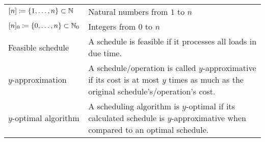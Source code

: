 \begin{table}[H]
\begin{tabularx}{\textwidth}{ | >{\centering\arraybackslash}X | >{\arraybackslash}m{} | }
  \hline \multicolumn{2}{|c|}{\textbf{\large Miscellaneous}} \\  
  \hline $[n]\coloneqq\{1,\dotsc,n\}\subset\mathbb{N}$&Natural numbers from $1$ to $n$\\
  \hline $[n]_0\coloneqq\{0,\dotsc,n\}\subset\mathbb{N}_0$&Integers from $0$ to $n$\\
  \hline Feasible schedule&A schedule is feasible if it processes all loads in due time.\\
  \hline $y$-approximation&A schedule/operation is called $y$-approximative if its cost is at most $y$ times as much as the original schedule's/operation's cost.\\
  \hline $y$-optimal algorithm&A scheduling algorithm is $y$-optimal if its calculated schedule is $y$-approximative when compared to an optimal schedule.\\
  \hline
\end{tabularx}
\end{table}
